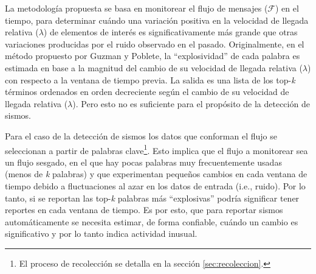 La metodología propuesta se basa en monitorear el flujo de mensajes ($\mathcal{F}$) en el tiempo, para determinar cuándo una variación positiva en la velocidad de llegada relativa ($\lambda$) de elementos de interés es significativamente más grande que otras variaciones producidas por el ruido observado en el pasado.
%
Originalmente, en el método propuesto por Guzman y Poblete, la ``explosividad'' de cada palabra es estimada en base a la magnitud del cambio de su velocidad de llegada relativa ($\lambda$) con respecto a la ventana de tiempo previa.
%
La salida es una lista de los top-\emph{k} términos ordenados en orden decreciente según el cambio de su velocidad de llegada relativa ($\lambda$).
%
Pero esto no es suficiente para el propósito de la detección de sismos. 

Para el caso de la detección de sismos los datos que conforman el flujo se seleccionan a partir de palabras clave\footnote{El proceso de recolección se detalla en la sección \ref{sec:recoleccion}.}. 
%
Esto implica que el flujo a monitorear sea un flujo sesgado, en el que hay pocas palabras muy frecuentemente usadas (menos de \emph{k} palabras) y que experimentan pequeños cambios en cada ventana de tiempo debido a fluctuaciones al azar en los datos de entrada (i.e., ruido).
%
Por lo tanto, si se reportan las top-\emph{k} palabras más ``explosivas'' podría significar tener reportes en cada ventana de tiempo.
%
Es por esto, que para reportar sismos automáticamente se necesita estimar, de forma confiable, cuándo un cambio es significativo y por lo tanto indica actividad inusual.

